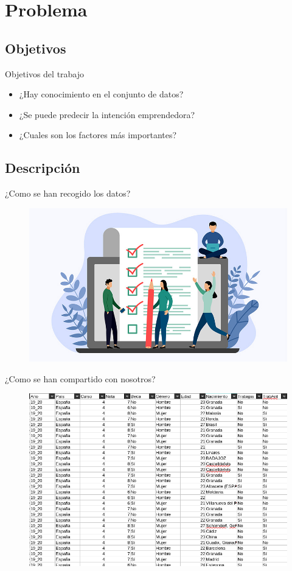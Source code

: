 \documentclass{beamer}
\begin{document}
\section{Problema}
		\subsection{Objetivos}
\begin{frame}{Objetivos del trabajo}
	\begin{itemize}
		\item ¿Hay conocimiento en el conjunto de datos?
		\item ¿Se puede predecir la intención emprendedora?
		\item ¿Cuales son los factores más importantes?
	\end{itemize}
\end{frame}
	\subsection{Descripción}
		\begin{frame}{¿Como se han recogido los datos?}
 			\begin{figure}
			 	\centering
			 	\includegraphics[scale=0.4]{encuesta}
			 \end{figure}
		\end{frame}
	\begin{frame}{¿Como se han compartido con nosotros?}
 			\begin{figure}
				\includegraphics[scale=0.35]{datos}
			\end{figure}
		\end{frame}
\end{document}
